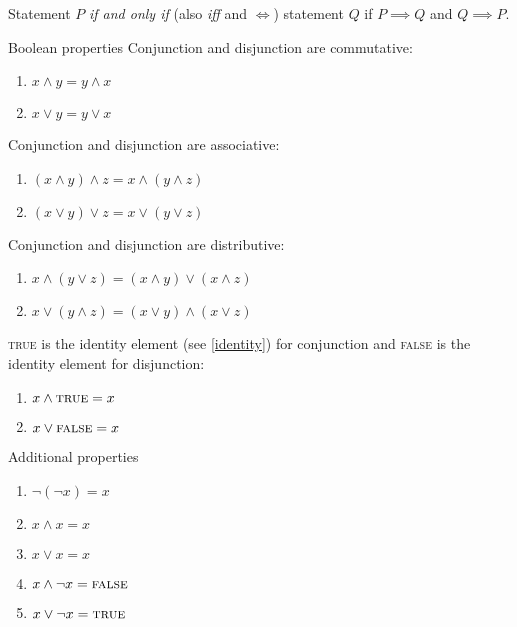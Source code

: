 \begin{defn}\label{iff}
    Statement $P$ \emph{if and only if} (also \emph{iff} and $\iff$) statement $Q$ if $P \implies Q$ and $Q \implies P$.
\end{defn}

\begin{thm}{Boolean properties}\label{boolean-algebraic-properties}\proofbreak
    Conjunction and disjunction are commutative:
    \begin{enumerate}
        \item $x \land y = y \land x$
        \item $x \lor y = y \lor x$
    \end{enumerate}

    Conjunction and disjunction are associative:
    \begin{enumerate}
        \item $(x \land y) \land z = x \land (y \land z)$
        \item $(x \lor y) \lor z = x \lor (y \lor z)$
    \end{enumerate}

    Conjunction and disjunction are distributive:
    \begin{enumerate}
        \item $x \land (y \lor z) = (x \land y) \lor (x \land z)$
        \item $x \lor (y \land z) = (x \lor y) \land (x \lor z)$
    \end{enumerate}

    \textup{\textsc{true}} is the identity element (see \ref{identity}) for conjunction and \textup{\textsc{false}} is the identity element for disjunction:
    \begin{enumerate}
        \item $x \land \textup{\textsc{true}} = x$
        \item $x \lor \textup{\textsc{false}} = x$
    \end{enumerate}
\end{thm}

\begin{thm}{Additional properties}\label{additional-boolean-properties}\proofbreak
    \begin{enumerate}
        \item $\neg(\neg x) = x$
        \item $x \land x = x$
        \item $x \lor x = x$
        \item $x \land \neg x = \textup{\textsc{false}}$
        \item $x \lor \neg x = \textup{\textsc{true}}$
    \end{enumerate}
\end{thm}

